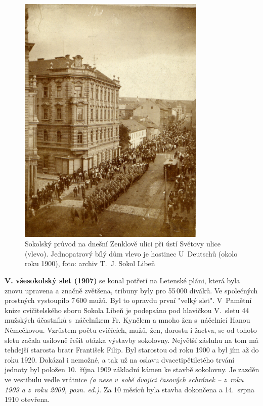 \documentclass[a5paper, 11pt, twoside]{article}
\newcommand{\pozned}[1]{%
\textit{#1}}
\begin{document}
\begin{figure}[h!]
  \centering
  \includegraphics[width=0.8\textwidth]{img/16_pruvod_1900.jpg}
  \caption*{Sokolský průvod na dnešní Zenklově ulici při ústí Světovy ulice (vlevo). Jednopatrový bílý dům vlevo je hostinec U~Deutschů (okolo roku 1900), foto: archiv T.~J. Sokol Libeň}
\end{figure}

\clearpage

\textbf{V. všesokolský slet (1907)} se konal potřetí na Letenské pláni, která byla znovu upravena a značně zvětšena, tribuny byly pro 55\,000 diváků. Ve společných prostných vystoupilo 7\,600 mužů. Byl to opravdu první "velký slet". V~Pamětní knize cvičitelského sboru Sokola Libeň je podepsáno pod hlavičkou V.~sletu 44 mužských účastníků s~náčelníkem Fr. Kynčlem a mnoho žen s~náčelnicí Hanou Němečkovou. Vzrůstem počtu cvičících, mužů, žen, dorostu i žactva, se od tohoto sletu začala usilovně řešit otázka výstavby sokolovny. Největší zásluhu na tom má tehdejší starosta bratr František Filip. Byl starostou od roku 1900 a byl jím až do roku 1920. Dokázal i nemožné, a tak už na oslavu dvacetipětiletého trvání jednoty byl položen 10.~října 1909 základní kámen ke stavbě sokolovny. Je zazděn ve vestibulu vedle vrátnice \pozned{(a nese v~sobě dvojici časových schránek – z~roku 1909 a z~roku 2009, pozn. ed.)}. Za 10 měsíců byla stavba dokončena a 14.~srpna 1910 otevřena.
\end{document}

